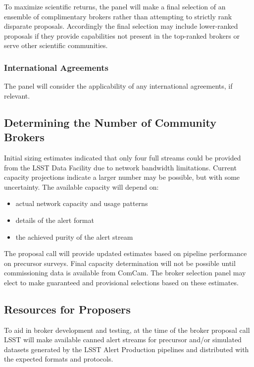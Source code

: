 To maximize scientific returns, the panel will make a final selection of an ensemble of complimentary brokers rather than attempting to strictly rank disparate proposals.   Accordingly the final selection may include lower-ranked proposals if they provide capabilities not present in the top-ranked brokers or serve other scientific communities.

\subsubsection{International Agreements}

The panel will consider the applicability of any international agreements, if relevant.

\subsection{Determining the Number of Community Brokers} \label{sec:numbrokers}

Initial sizing estimates indicated that only four full streams could be provided from the LSST Data Facility due to network bandwidth limitations.  
Current capacity projections indicate a larger number may be possible, but with some uncertainty.
The available capacity will depend on:

\begin{itemize}
	\item actual network capacity and usage patterns
	\item details of the alert format
	\item the achieved purity of the alert stream
\end{itemize}

The proposal call will provide updated estimates based on pipeline performance on precursor surveys.
Final capacity determination will not be possible until commissioning data is available from ComCam.
The broker selection panel may elect to make guaranteed and provisional selections based on these estimates.

\subsection{Resources for Proposers}

To aid in broker development and testing, at the time of the broker proposal call LSST will make available canned alert streams for precursor and/or simulated datasets generated by the LSST Alert Production pipelines and distributed with the expected formats and protocols.

